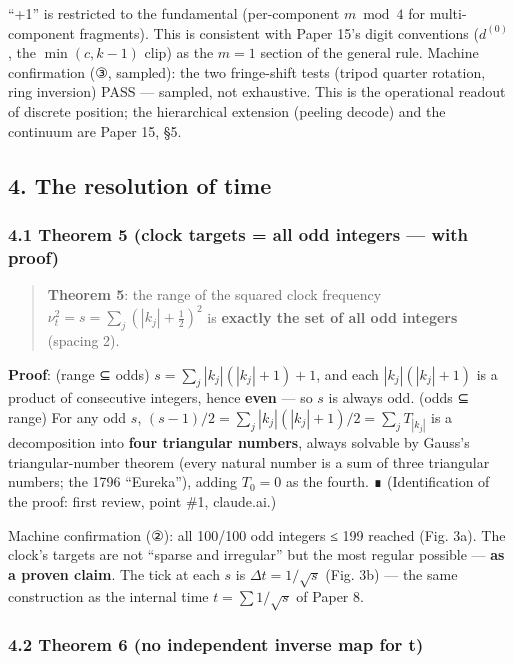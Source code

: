 \documentclass[
]{article}
\begin{document}
``+1'' is restricted to the fundamental (per-component \(m\bmod4\) for
multi-component fragments). This is consistent with Paper 15's digit
conventions (\(d^{(0)}\), the \(\min(c,k{-}1)\) clip) as the \(m=1\)
section of the general rule. Machine confirmation (③, sampled): the two
fringe-shift tests (tripod quarter rotation, ring inversion) PASS ---
sampled, not exhaustive. This is the operational readout of discrete
position; the hierarchical extension (peeling decode) and the continuum
are Paper 15, §5.

\subsection{4. The resolution of time}\label{the-resolution-of-time}

\subsubsection{4.1 Theorem 5 (clock targets = all odd integers --- with
proof)}\label{theorem-5-clock-targets-all-odd-integers-with-proof}

\begin{quote}
\textbf{Theorem 5}: the range of the squared clock frequency
\(\nu_t^2=s=\sum_j(|k_j|+\tfrac12)^2\) is \textbf{exactly the set of all
odd integers} (spacing 2).
\end{quote}

\textbf{Proof}: (range ⊆ odds) \(s=\sum_j|k_j|(|k_j|+1)+1\), and each
\(|k_j|(|k_j|+1)\) is a product of consecutive integers, hence
\textbf{even} --- so \(s\) is always odd. (odds ⊆ range) For any odd
\(s\), \((s-1)/2=\sum_j|k_j|(|k_j|+1)/2=\sum_j T_{|k_j|}\) is a
decomposition into \textbf{four triangular numbers}, always solvable by
Gauss's triangular-number theorem (every natural number is a sum of
three triangular numbers; the 1796 ``Eureka''), adding \(T_0=0\) as the
fourth. ∎ (Identification of the proof: first review, point \#1,
claude.ai.)

Machine confirmation (②): all 100/100 odd integers ≤ 199 reached (Fig.
3a). The clock's targets are not ``sparse and irregular'' but the most
regular possible --- \textbf{as a proven claim}. The tick at each \(s\)
is \(\Delta t=1/\sqrt{s}\) (Fig. 3b) --- the same construction as the
internal time \(t=\sum1/\sqrt{s}\) of Paper 8.

\subsubsection{4.2 Theorem 6 (no independent inverse map for
t)}\label{theorem-6-no-independent-inverse-map-for-t}
\end{document}
